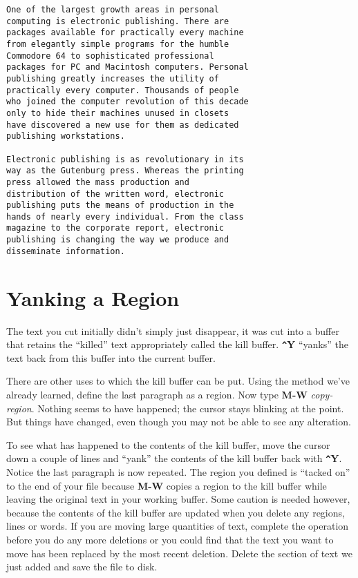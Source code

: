 \begin{verbatim} 
One of the largest growth areas in personal
computing is electronic publishing. There are
packages available for practically every machine
from elegantly simple programs for the humble
Commodore 64 to sophisticated professional
packages for PC and Macintosh computers. Personal
publishing greatly increases the utility of
practically every computer. Thousands of people
who joined the computer revolution of this decade
only to hide their machines unused in closets
have discovered a new use for them as dedicated
publishing workstations.

Electronic publishing is as revolutionary in its
way as the Gutenburg press. Whereas the printing
press allowed the mass production and
distribution of the written word, electronic
publishing puts the means of production in the
hands of nearly every individual. From the class
magazine to the corporate report, electronic
publishing is changing the way we produce and
disseminate information.
\end{verbatim}

\section{Yanking a Region}

The text you cut initially didn't simply just disappear, it was cut
into a buffer that retains the ``killed'' text appropriately called the
kill buffer. {\bf \verb+^+Y} ``yanks'' the text back from this buffer
into the current buffer. 

There are other uses to which the kill buffer can be put. Using the
method we've already learned, define the last paragraph as a region.
Now type {\bf M-W} {\it copy-region}. Nothing seems to have happened;
the cursor stays blinking at the point. But things have changed, even
though you may not be able to see any alteration.

To see what has happened to the contents of the kill buffer, move the
cursor down a couple of lines and ``yank'' the contents of the kill
buffer back with {\bf \verb+^+Y}. Notice the last paragraph is now
repeated. The region you defined is ``tacked on'' to the end of your file
because {\bf M-W} copies a region to the kill buffer while leaving the
original text in your working buffer. Some caution is needed however,
because the contents of the kill buffer are updated when you delete any
regions, lines or words. If you are moving large quantities of text,
complete the operation before you do any more deletions or you could
find that the text you want to move has been replaced by the most
recent deletion. Delete the section of text we just added and save the
file to disk.

